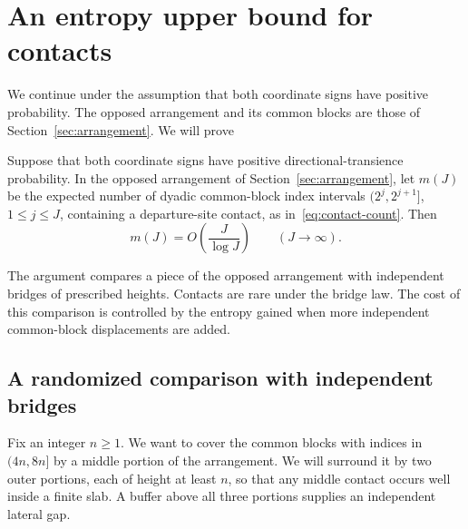 \section{An entropy upper bound for contacts}\label{sec:entropy}

We continue under the assumption that both coordinate signs have positive
probability.  The opposed arrangement and its common blocks are those of
Section~\ref{sec:arrangement}.  We will prove
\begin{proposition}\label{prop:entropy-upper}
Suppose that both coordinate signs have positive directional-transience
probability. In the opposed arrangement of Section~\ref{sec:arrangement},
let $m(J)$ be the expected number of dyadic common-block index intervals
$(2^j,2^{j+1}]$, $1\le j\le J$, containing a departure-site contact,
as in~\eqref{eq:contact-count}. Then
\[
 m(J)=O\!\left(\frac{J}{\log J}\right)\qquad(J\longrightarrow\infty).
\]
\end{proposition}
The argument compares a piece of the opposed arrangement with independent
bridges of prescribed heights.  Contacts are rare under the bridge law.
The cost of this comparison is controlled by the entropy gained when more
independent common-block displacements are added.

\subsection{A randomized comparison with independent bridges}

Fix an integer $n\ge1$.  We want to cover the common blocks with
indices in $(4n,8n]$ by a middle portion of the arrangement.  We will
surround it by two outer portions, each of height at least $n$, so
that any middle contact occurs well inside a finite slab.  A buffer
above all three portions supplies an independent lateral gap.

